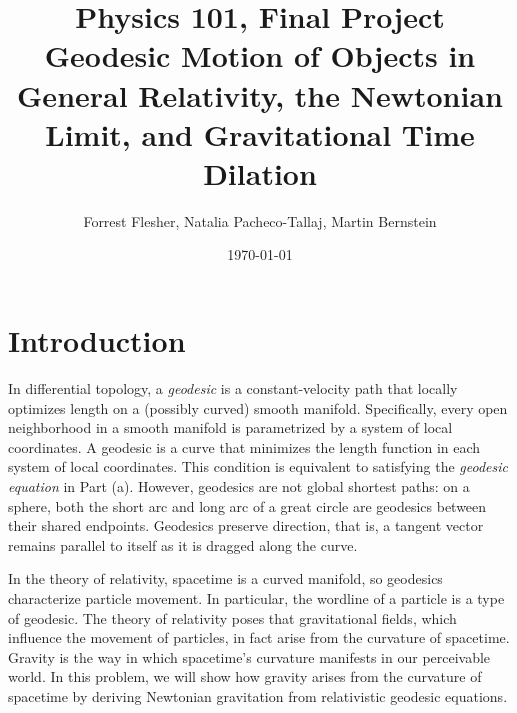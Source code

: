 \documentclass[12pt]{article}
\title{Physics 101, Final Project \\ \Large Geodesic Motion of Objects in General Relativity, the Newtonian Limit, and Gravitational Time Dilation
}
\date{\today}
\author{Forrest Flesher, Natalia Pacheco-Tallaj, Martin Bernstein }
\theoremstyle{definition}
\theoremstyle{remark}
\begin{document}
\maketitle

\section*{Introduction}
	In differential topology, a \emph{geodesic} is a constant-velocity path that locally optimizes length on a (possibly curved) smooth manifold. 
	Specifically, every open neighborhood in a smooth manifold is parametrized by a system of local coordinates. A geodesic is a curve that minimizes the length function in each system of local coordinates. This condition is equivalent to satisfying the \emph{geodesic equation} in Part (a). However, geodesics are not global shortest paths: on a sphere, both the short arc and long arc of a great circle are geodesics between their shared endpoints. 
	Geodesics preserve direction, that is, a tangent vector remains parallel to itself as it is dragged along the curve. 

	In the theory of relativity, spacetime is a curved manifold, so geodesics characterize particle movement. In particular, the wordline of a particle is a type of geodesic. The theory of relativity poses that gravitational fields, which influence the movement of particles, in fact arise from the curvature of spacetime. Gravity is the way in which spacetime's curvature manifests in our perceivable world. In this problem, we will show how gravity arises from the curvature of spacetime by deriving Newtonian gravitation from relativistic geodesic equations.  


\end{document}
